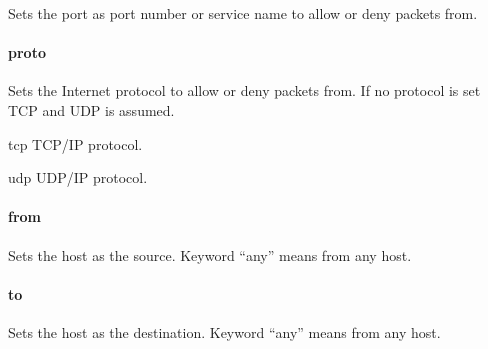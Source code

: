 
Sets the port as port number or service name to allow or deny packets from.

\paragraph{proto}


Sets the Internet protocol to allow or deny packets from. If no protocol
is set TCP and UDP is assumed.

\begin{compactdesc}
\item[tcp] TCP/IP protocol.
\item[udp] UDP/IP protocol.
\end{compactdesc}

\paragraph{from}


Sets the host as the source. Keyword ``any'' means from any host.

\paragraph{to}


Sets the host as the destination. Keyword ``any'' means from any host.

